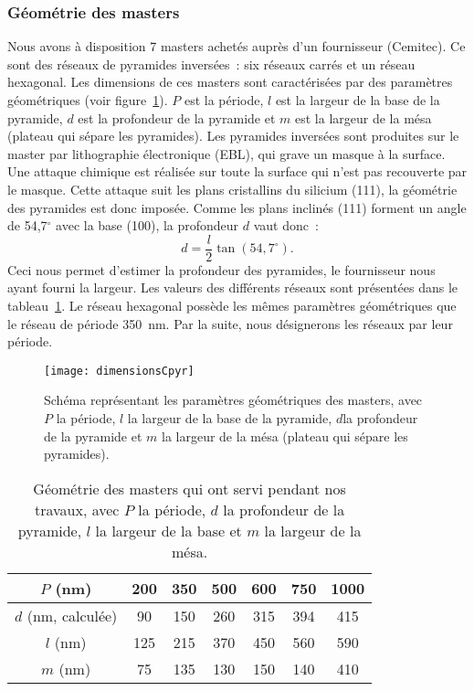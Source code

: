 	\subsubsection{Géométrie des masters}
Nous avons à disposition 7 masters achetés auprès d'un fournisseur (Cemitec). Ce sont des réseaux de pyramides inversées~: six réseaux carrés et un réseau hexagonal. Les dimensions de ces masters sont caractérisées par des paramètres géométriques (voir figure~\ref{dimensionsCpyrChapter3}). $P$ est la période, $l$ est la largeur de la base de la pyramide, $d$ est la profondeur de la pyramide et $m$ est la largeur de la mésa (plateau qui sépare les pyramides). Les pyramides inversées sont produites sur le master par lithographie électronique (EBL), qui grave un masque à la surface. Une attaque chimique est réalisée sur toute la surface qui n'est pas recouverte par le masque. Cette attaque suit les plans cristallins du silicium (111), la géométrie des pyramides est donc imposée. Comme les plans inclinés (111) forment un angle de 54,7$^\circ$ avec la base (100), la profondeur $d$ vaut donc~:
\begin{equation}
d = \dfrac{l}{2}\tan(54,7^\circ).
\end{equation}
Ceci nous permet d'estimer la profondeur des pyramides, le fournisseur nous ayant fourni la largeur. Les valeurs des différents réseaux sont présentées dans le tableau~\ref{tGeometrie}. Le réseau hexagonal possède les mêmes paramètres géométriques que le réseau de période 350~nm. Par la suite, nous désignerons les réseaux par leur période.\par 

\begin{figure}[!htb]
\centering
\texttt{[image: dimensionsCpyr]}
\caption{Schéma représentant les paramètres géométriques des masters, avec $P$ la période, $l$ la largeur de la base de la pyramide, $d$la profondeur de la pyramide et $m$ la largeur de la mésa (plateau qui sépare les pyramides).}
\label{dimensionsCpyrChapter3}
\end{figure}

\begin{table}[!htb]
\centering
\begin{tabular}{ccccccc}
\hline
$P$ (nm) & 200 & 350 & 500 & 600 & 750 & 1000\\
\hline
$d$ (nm, calculée) & 90 & 150 & 260 & 315 & 394 & 415\\
$l$ (nm) & 125 & 215 & 370 & 450 & 560 & 590\\
$m$ (nm) & 75 & 135 & 130 & 150 & 140 & 410\\
\hline
\end{tabular}
\caption{Géométrie des masters qui ont servi pendant nos travaux, avec $P$ la période, $d$ la profondeur de la pyramide, $l$ la largeur de la base et $m$ la largeur de la mésa.}
\label{tGeometrie}
\end{table}

